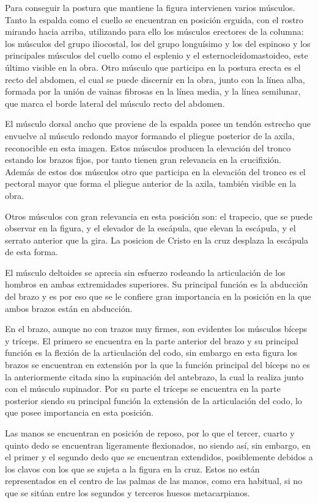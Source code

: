 Para conseguir la postura que mantiene la figura intervienen varios músculos.
Tanto la espalda como el cuello se encuentran en posición erguida, con el rostro mirando hacia arriba, utilizando para ello los músculos erectores de la columna: los músculos del grupo iliocostal, los del grupo longuísimo y los del espinoso y los principales músculos del cuello como el esplenio y el esternocleidomastoideo, este último visible en la obra. Otro músculo que participa en la postura erecta es el recto del abdomen, el cual se puede discernir en la obra, junto con la línea alba, formada por la unión de vainas fibrosas en la línea media, y la línea semilunar, que marca el borde lateral del músculo recto del abdomen.

El músculo dorsal ancho que proviene de la espalda posee un tendón estrecho que envuelve al músculo redondo mayor formando el pliegue posterior de la axila, reconocible en esta imagen. Estos músculos producen la elevación del tronco estando los brazos fijos, por tanto tienen gran relevancia en la crucifixión. Además de estos dos músculos otro que participa en la elevación del tronco es el pectoral mayor que forma el pliegue anterior de la axila, también visible en la obra.

Otros músculos con gran relevancia en esta posición son: el trapecio, que se puede observar en la figura, y el elevador de la escápula, que elevan la escápula, y el serrato anterior que la gira. La posicion de Cristo en la cruz desplaza la escápula de esta forma.

El músculo deltoides se aprecia sin esfuerzo rodeando la articulación de los hombros en ambas extremidades superiores. Su principal función es la abducción del brazo y es por eso que se le confiere gran importancia en la posición en la que ambos brazos están en abducción.

En el brazo, aunque no con trazos muy firmes, son evidentes los músculos bíceps y tríceps. El primero se encuentra en la parte anterior del brazo y su principal función es la flexión de la articulación del codo, sin embargo en esta figura los brazos se encuentran en extensión por la que la función principal del bíceps no es la anteriormente citada sino la supinación del antebrazo, la cual la realiza junto con el músculo supinador. Por su parte el tríceps se encuentra en la parte posterior siendo su principal función la extensión de la articulación del codo, lo que posee importancia en esta posición. 

Las manos se encuentran en posición de reposo, por lo que el tercer, cuarto y quinto dedo se encuentran ligeramente flexionados, no siendo así, sin embargo, en el primer y el segundo dedo que se encuentran extendidos, posiblemente debidos a los clavos con los que se sujeta a la figura en la cruz. Estos no están representados en el centro de las palmas de las manos, como era habitual, si no que se sitúan entre los segundos y terceros huesos metacarpianos.

